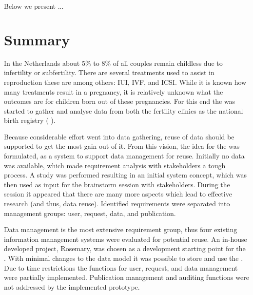 

Below we present ...

\section{Summary}

In the Netherlands about 5\% to 8\% of all couples remain childless due to infertility or subfertility.
There are several treatments used to assist in reproduction these are among others: IUI, IVF, and ICSI.
While it is known how many treatments result in a pregnancy, it is relatively unknown what the outcomes are for children born out of these pregnancies.
For this end the \project{} was started to gather and analyse data from both the fertility clinics as the national birth registry (\ie{} \PRN{}).

Because considerable effort went into data gathering, reuse of data should be supported to get the most gain out of it.
From this vision, the idea for the \ivfsystem{} was formulated, as a system to support data management for reuse.
Initially no data was available, which made requirement analysis with stakeholders a tough process.
A study was performed resulting in an initial system concept, which was then used as input for the brainstorm session with stakeholders.
During the session it appeared that there are many more aspects which lead to effective research (and thus, data reuse).
Identified requirements were separated into management groups: user, request, data, and publication.

Data management is the most extensive requirement group, thus four existing information management systems were evaluated for potential reuse.
An in-house developed project, Rosemary, was chosen as a development starting point for the \ivfsystem{}.
With minimal changes to the data model it was possible to store and use the \projectdata{}.
Due to time restrictions the functions for user, request, and data management were partially implemented.
Publication management and auditing functions were not addressed by the implemented prototype.


